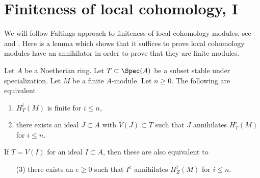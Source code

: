\section{Finiteness of local cohomology, I}
\label{section-finiteness}

\noindent
We will follow Faltings approach to finiteness of local cohomology
modules, see \cite{Faltings-annulators} and \cite{Faltings-finiteness}.
Here is a lemma which shows that it suffices to prove
local cohomology modules have an annihilator in order to prove that
they are finite modules.

\begin{lemma}
\label{lemma-check-finiteness-local-cohomology-by-annihilator}
\begin{reference}
\cite[Lemma 3]{Faltings-annulators}
\end{reference}
Let $A$ be a Noetherian ring. Let $T \subset \Spec(A)$ be a subset stable
under specialization. Let $M$ be a finite $A$-module. Let $n \geq 0$.
The following are equivalent
\begin{enumerate}
\item $H^i_T(M)$ is finite for $i \leq n$,
\item there exists an ideal $J \subset A$ with $V(J) \subset T$
such that $J$ annihilates $H^i_T(M)$ for $i \leq n$.
\end{enumerate}
If $T = V(I)$ for an ideal $I \subset A$, then these are also
equivalent to
\begin{enumerate}
\item[(3)] there exists an $e \geq 0$ such that $I^e$ annihilates
$H^i_Z(M)$ for $i \leq n$.
\end{enumerate}
\end{lemma}

